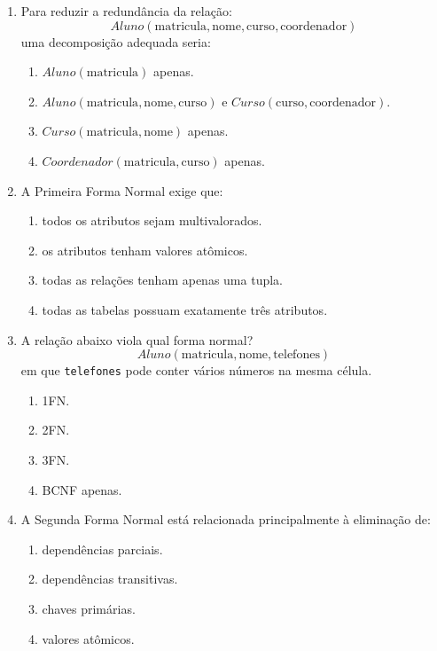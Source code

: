 \documentclass[12pt,a4paper]{article}
\begin{document}
\begin{enumerate}[label=\textbf{Q\arabic*.}]
\item Para reduzir a redundância da relação:
\[
Aluno(\text{matricula}, \text{nome}, \text{curso}, \text{coordenador})
\]
uma decomposição adequada seria:

\begin{enumerate}[label=\alph*)]
    \item $Aluno(\text{matricula})$ apenas.
    \item $Aluno(\text{matricula}, \text{nome}, \text{curso})$ e $Curso(\text{curso}, \text{coordenador})$.
    \item $Curso(\text{matricula}, \text{nome})$ apenas.
    \item $Coordenador(\text{matricula}, \text{curso})$ apenas.
\end{enumerate}

\item A Primeira Forma Normal exige que:

\begin{enumerate}[label=\alph*)]
    \item todos os atributos sejam multivalorados.
    \item os atributos tenham valores atômicos.
    \item todas as relações tenham apenas uma tupla.
    \item todas as tabelas possuam exatamente três atributos.
\end{enumerate}

\item A relação abaixo viola qual forma normal?
\[
Aluno(\text{matricula}, \text{nome}, \text{telefones})
\]
em que \texttt{telefones} pode conter vários números na mesma célula.

\begin{enumerate}[label=\alph*)]
    \item 1FN.
    \item 2FN.
    \item 3FN.
    \item BCNF apenas.
\end{enumerate}

\item A Segunda Forma Normal está relacionada principalmente à eliminação de:

\begin{enumerate}[label=\alph*)]
    \item dependências parciais.
    \item dependências transitivas.
    \item chaves primárias.
    \item valores atômicos.
\end{enumerate}


\end{enumerate}
\end{document}
